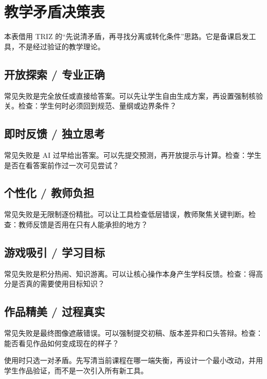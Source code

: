 \chapter{教学矛盾决策表}

本表借用 TRIZ 的“先说清矛盾，再寻找分离或转化条件”思路。它是备课启发工具，不是经过验证的教学理论。

\section*{开放探索 / 专业正确}
常见失败是完全放任或直接给答案。可以先让学生自由生成方案，再设置强制核验关。检查：学生何时必须回到规范、量纲或边界条件？

\section*{即时反馈 / 独立思考}
常见失败是 AI 过早给出答案。可以先提交预测，再开放提示与计算。检查：学生是否在看答案前作过一次可见尝试？

\section*{个性化 / 教师负担}
常见失败是无限制逐份精批。可以让工具检查低层错误，教师聚焦关键判断。检查：教师反馈是否用在只有人能承担的地方？

\section*{游戏吸引 / 学习目标}
常见失败是积分热闹、知识游离。可以让核心操作本身产生学科反馈。检查：得高分是否真的需要使用目标知识？

\section*{作品精美 / 过程真实}
常见失败是最终图像遮蔽错误。可以强制提交初稿、版本差异和口头答辩。检查：能否看见作品如何变成现在的样子？

使用时只选一对矛盾。先写清当前课程在哪一端失衡，再设计一个最小改动，并用学生作品验证，而不是一次引入所有新工具。
